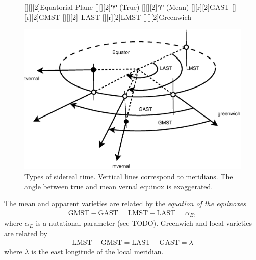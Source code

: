 \documentclass [12pt, a4paper] {article}
\begin{document}
\begin {figure}
  \begin {center}
    [][][2]{Equatorial Plane}
    [][][2]{$\aries$ (True)}
    [][][2]{$\aries$ (Mean)}
    [][r][2]{GAST}
    [][r][2]{GMST}
    [][][2]{$\:\:$LAST}
    [][r][2]{LMST}
    [][][2]{Greenwich}
 
     \includegraphics [angle=0, width=0.75\columnwidth] {figures/GAST.eps}
     \caption{\label{fig:sidereal}Types of sidereal time. Vertical lines correspond 
     to meridians. The angle between true and mean vernal equinox is exaggerated.}
  \end {center}
\end {figure} 
The mean and apparent varieties are related by the \emph{equation of the equinoxes}
\begin {eqnarray}
  \label{eq:equinoxes}
  \textrm{GMST} - \textrm{GAST} = \textrm{LMST} - \textrm{LAST} = \alpha_E,
\end {eqnarray}
where $\alpha_E$ is a nutational parameter (see TODO). Greenwich and local varieties
are related by 
\begin {eqnarray}
  \textrm{LMST} - \textrm{GMST} = \textrm{LAST} - \textrm{GAST} = \lambda
\end {eqnarray}
where $\lambda$ is the east longitude of the local meridian.
\end{document}
